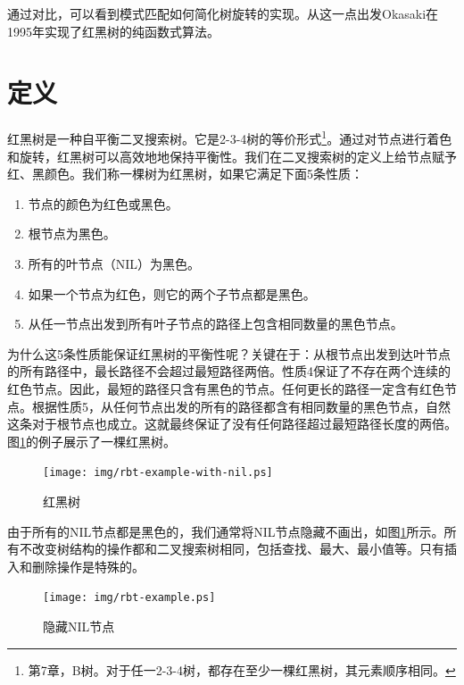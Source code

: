 \documentclass[b5paper]{ctexart}
\begin{document}
通过对比，可以看到模式匹配如何简化树旋转的实现。从这一点出发Okasaki在1995年实现了红黑树的纯函数式算法\cite{okasaki}。

\begin{Exercise}
\end{Exercise}

\section{定义}

红黑树是一种自平衡二叉搜索树\cite{wiki-rbt}。它是2-3-4树的等价形式\footnote{第7章，B树。对于任一2-3-4树，都存在至少一棵红黑树，其元素顺序相同。}。通过对节点进行着色和旋转，红黑树可以高效地地保持平衡性。我们在二叉搜索树的定义上给节点赋予红、黑颜色。我们称一棵树为红黑树，如果它满足下面5条性质\cite{CLRS}：

\begin{enumerate}
\item 节点的颜色为红色或黑色。
\item 根节点为黑色。
\item 所有的叶节点（NIL）为黑色。
\item 如果一个节点为红色，则它的两个子节点都是黑色。
\item 从任一节点出发到所有叶子节点的路径上包含相同数量的黑色节点。
\end{enumerate}

为什么这5条性质能保证红黑树的平衡性呢？关键在于：从根节点出发到达叶节点的所有路径中，最长路径不会超过最短路径两倍。性质4保证了不存在两个连续的红色节点。因此，最短的路径只含有黑色的节点。任何更长的路径一定含有红色节点。根据性质5，从任何节点出发的所有的路径都含有相同数量的黑色节点，自然这条对于根节点也成立。这就最终保证了没有任何路径超过最短路径长度的两倍\cite{wiki-rbt}。图\ref{fig:rbt-example-with-nil}的例子展示了一棵红黑树。

\begin{figure}[htbp]
  \centering
  \texttt{[image: img/rbt-example-with-nil.ps]}
  \caption{红黑树}
  \label{fig:rbt-example-with-nil}
\end{figure}

由于所有的NIL节点都是黑色的，我们通常将NIL节点隐藏不画出，如图\ref{fig:rbt-example-with-nil}所示。所有不改变树结构的操作都和二叉搜索树相同，包括查找、最大、最小值等。只有插入和删除操作是特殊的。

\begin{figure}[htbp]
  \centering
  \texttt{[image: img/rbt-example.ps]}
  \caption{隐藏NIL节点}
  \label{fig:rbt-example}
\end{figure}
\end{document}
